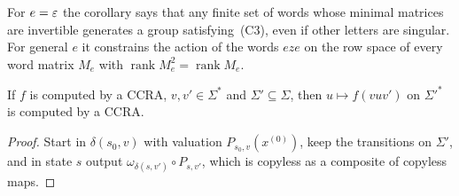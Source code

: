 For $e=\varepsilon$ the corollary says that any finite set of words whose minimal matrices are invertible generates a group satisfying~(C3), even if other letters are singular. For general $e$ it constrains the action of the words $eze$ on the row space of every word matrix $M_e$ with $\operatorname{rank}M_e^2=\operatorname{rank}M_e$.

\begin{lemma}\label{lem:quotients}
If $f$ is computed by a CCRA, $v,v'\in\Sigma^*$ and $\Sigma'\subseteq\Sigma$, then $u\mapsto f(vuv')$ on $\Sigma'^*$ is computed by a CCRA.
\end{lemma}
\begin{proof}
Start in $\delta(s_0,v)$ with valuation $P_{s_0,v}(x^{(0)})$, keep the transitions on $\Sigma'$, and in state $s$ output $\omega_{\delta(s,v')}\circ P_{s,v'}$, which is copyless as a composite of copyless maps.
\end{proof}

